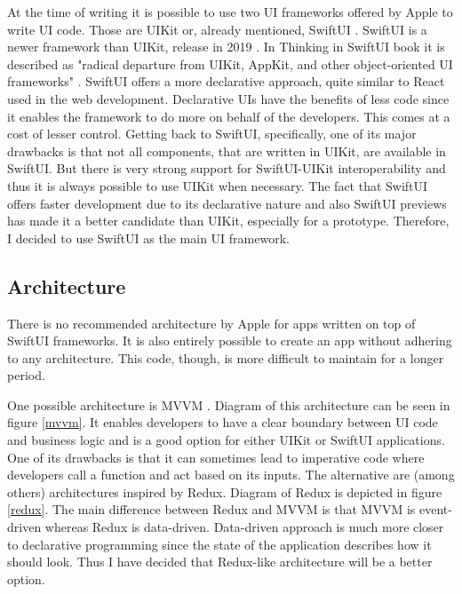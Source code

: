 At the time of writing it is possible to use two UI frameworks offered by Apple to write UI code. Those are UIKit \cite{uikit} or, already mentioned, SwiftUI \cite{swiftui}. SwiftUI is a newer framework than UIKit, release in 2019 \cite{swiftui-release}. In Thinking in SwiftUI book it is described as "radical departure from UIKit, AppKit, and other object-oriented UI frameworks" \cite{thinking-in-swiftui}. SwiftUI offers a more declarative approach, quite similar to React \cite{react} used in the web development. Declarative UIs have the benefits of less code since it enables the framework to do more on behalf of the developers. This comes at a cost of lesser control. Getting back to SwiftUI, specifically, one of its major drawbacks is that not all components, that are written in UIKit, are available in SwiftUI. But there is very strong support for SwiftUI-UIKit interoperability \cite{swiftui-interop} and thus it is always possible to use UIKit when necessary. The fact that SwiftUI offers faster development due to its declarative nature and also SwiftUI previews \cite{swiftui-preview} has made it a better candidate than UIKit, especially for a prototype. Therefore, I decided to use SwiftUI as the main UI framework.

\subsection{Architecture}

There is no recommended architecture by Apple for apps written on top of SwiftUI frameworks. It is also entirely possible to create an app without adhering to any architecture. This code, though, is more difficult to maintain for a longer period.

One possible architecture is MVVM \cite{mvvm}. Diagram of this architecture can be seen in figure \ref{mvvm}. It enables developers to have a clear boundary between UI code and business logic and is a good option for either UIKit or SwiftUI applications. One of its drawbacks is that it can sometimes lead to imperative code where developers call a function and act based on its inputs. The alternative are (among others) architectures inspired by Redux. Diagram of Redux is depicted in figure \ref{redux}. The main difference between Redux and MVVM is that MVVM is event-driven whereas Redux is data-driven. Data-driven approach is much more closer to declarative programming since the state of the application describes how it should look. Thus I have decided that Redux-like architecture will be a better option.

